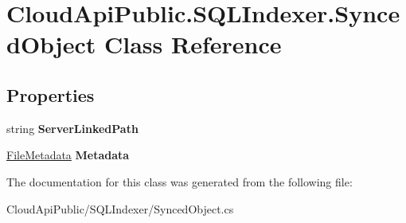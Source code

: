 \hypertarget{class_cloud_api_public_1_1_s_q_l_indexer_1_1_synced_object}{\section{Cloud\-Api\-Public.\-S\-Q\-L\-Indexer.\-Synced\-Object Class Reference}
\label{class_cloud_api_public_1_1_s_q_l_indexer_1_1_synced_object}
}
\subsection*{Properties}
\begin{DoxyCompactItemize}
\item 
\hypertarget{class_cloud_api_public_1_1_s_q_l_indexer_1_1_synced_object_af9a14a4f36d87e506ba46d09c2e1844e}{string {\bfseries Server\-Linked\-Path}}\label{class_cloud_api_public_1_1_s_q_l_indexer_1_1_synced_object_af9a14a4f36d87e506ba46d09c2e1844e}

\item 
\hypertarget{class_cloud_api_public_1_1_s_q_l_indexer_1_1_synced_object_a61ab1d389be8584b88de0e0adaaba90c}{\hyperlink{class_cloud_api_public_1_1_model_1_1_file_metadata}{File\-Metadata} {\bfseries Metadata}}\label{class_cloud_api_public_1_1_s_q_l_indexer_1_1_synced_object_a61ab1d389be8584b88de0e0adaaba90c}

\end{DoxyCompactItemize}


The documentation for this class was generated from the following file\-:\begin{DoxyCompactItemize}
\item 
Cloud\-Api\-Public/\-S\-Q\-L\-Indexer/Synced\-Object.\-cs\end{DoxyCompactItemize}
